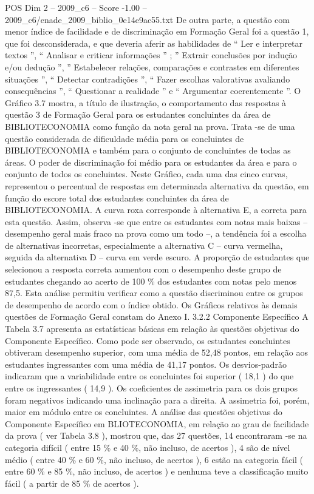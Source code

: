 \begin{textsample}{POS Dim 2 – 2009\_c6 – Score -1.00 – 2009\_c6/enade\_2009\_biblio\_0e14e9ac55.txt}
De outra parte, a questão com menor índice de facilidade e de discriminação em Formação Geral foi a questão 1, que foi desconsiderada, e que deveria aferir as habilidades de “ Ler e interpretar textos ”, “ Analisar e criticar informações ” ; ” Extrair conclusões por indução e/ou dedução ”, ” Estabelecer relações, comparações e contrastes em diferentes situações ”, “ Detectar contradições ”, “ Fazer escolhas valorativas avaliando consequências ”, “ Questionar a realidade ” e “ Argumentar coerentemente ”.
O Gráfico 3.7 mostra, a título de ilustração, o comportamento das respostas à questão 3 de Formação Geral para os estudantes concluintes da área de BIBLIOTECONOMIA como função da nota geral na prova.
Trata -se de uma questão considerada de dificuldade média para os concluintes de BIBLIOTECONOMIA e também para o conjunto de concluintes de todas as áreas.
O poder de discriminação foi médio para os estudantes da área e para o conjunto de todos os concluintes.
Neste Gráfico, cada uma das cinco curvas, representou o percentual de respostas em determinada alternativa da questão, em função do escore total dos estudantes concluintes da área de BIBLIOTECONOMIA.
A curva roxa corresponde à alternativa E, a correta para esta questão.
Assim, observa -se que entre os estudantes com notas mais baixas – desempenho geral mais fraco na prova como um todo –, a tendência foi a escolha de alternativas incorretas, especialmente a alternativa C – curva vermelha, seguida da alternativa D – curva em verde escuro.
A proporção de estudantes que selecionou a resposta correta aumentou com o desempenho deste grupo de estudantes chegando ao acerto de 100 \% dos estudantes com notas pelo menos 87,5.
Esta análise permitiu verificar como a questão discriminou entre os grupos de desempenho de acordo com o índice obtido.
Os Gráficos relativos às demais questões de Formação Geral constam do Anexo I. 3.2.2 Componente Específico A Tabela 3.7 apresenta as estatísticas básicas em relação às questões objetivas do Componente Específico.
Como pode ser observado, os estudantes concluintes obtiveram desempenho superior, com uma média de 52,48 pontos, em relação aos estudantes ingressantes com uma média de 41,17 pontos.
Os desvios-padrão indicaram que a variabilidade entre os concluintes foi superior ( 18,1 ) do que entre os ingressantes ( 14,9 ).
Os coeficientes de assimetria para os dois grupos foram negativos indicando uma inclinação para a direita.
A assimetria foi, porém, maior em módulo entre os concluintes.
A análise das questões objetivas do Componente Específico em BLIOTECONOMIA, em relação ao grau de facilidade da prova ( ver Tabela 3.8 ), mostrou que, das 27 questões, 14 encontraram -se na categoria difícil ( entre 15 \% e 40 \%, não incluso, de acertos ), 4 são de nível médio ( entre 40 \% e 60 \%, não incluso, de acertos ), 6 estão na categoria fácil ( entre 60 \% e 85 \%, não incluso, de acertos ) e nenhuma teve a classificação muito fácil ( a partir de 85 \% de acertos ).

\end{textsample}
